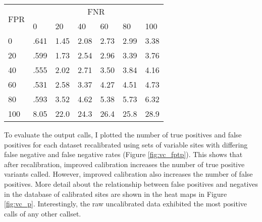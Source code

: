 \begin{table}
\centering
\begin{tabularx}{.5\textwidth}{ l  X  X  X  X  X  X }
\toprule
\multirow{2}{*}{FPR} & \multicolumn{6}{c}{FNR} \\ \cmidrule(lr){2-7}
    & 0    &   20 &   40 &   60 &   80 &   100 \\
\midrule
0   & .641 & 1.45 & 2.08 & 2.73 & 2.99 & 3.38 \\
20  & .599 & 1.73 & 2.54 & 2.96 & 3.39 & 3.76 \\
40  & .555 & 2.02 & 2.71 & 3.50 & 3.84 & 4.16 \\
60  & .531 & 2.58 & 3.37 & 4.27 & 4.51 & 4.73 \\
80  & .593 & 3.52 & 4.62 & 5.38 & 5.73 & 6.32 \\
100 & 8.05 & 22.0 & 24.3 & 26.4 & 25.8 & 28.9 \\
\bottomrule
\end{tabularx}
\label{table:fnrfpr}
\end{table}



To evaluate the output calls, I plotted the number of true positives and false positives for each dataset recalibrated using sets of variable sites with differing false negative and false negative rates (Figure \ref{fig:vc_fptp}). This shows that after recalibration, improved calibration increases the number of true positive variants called. However, improved calibration also increases the number of false positives. More detail about the relationship between false positives and negatives in the database of calibrated sites are shown in the heat maps in Figure \ref{fig:vc_p}. Interestingly, the raw uncalibrated data exhibited the most positive calls of any other callset.


